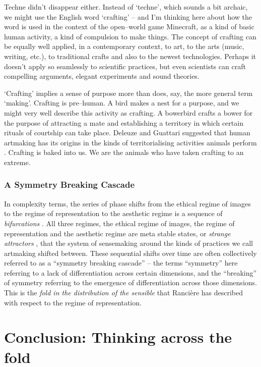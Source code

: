\documentclass[letterpaper]{article}
\begin{document}
    Techne didn't disappear either. Instead of ‘techne’, which sounds a bit archaic, we might use the English word ‘crafting’ – and I'm thinking here about how the word is used in the context of the open–world game Minecraft, as a kind of basic human activity, a kind of compulsion to make things. The concept of crafting can be equally well applied, in a contemporary context, to art, to the arts (music, writing, etc.), to traditional crafts and also to the newest technologies. Perhaps it doesn't apply so seamlessly to scientific practices, but even scientists can craft compelling arguments, elegant experiments and sound theories.

    ‘Crafting’ implies a sense of purpose more than does, say, the more general term ‘making’. Crafting is pre–human. A bird makes a nest for a purpose, and we might very well describe this activity as crafting. A bowerbird crafts a bower for the purpose of attracting a mate and establishing a territory in which certain rituals of courtship can take place. Deleuze and Guattari suggested that human artmaking has its origins in the kinds of territorialising activities animals perform \citep[p.15]{GuattariChsmss1995}. Crafting is baked into us. We are the animals who have taken crafting to an extreme.
    
    \subsubsection{A Symmetry Breaking Cascade}

    In complexity terms, the series of phase shifts from the ethical regime of images to the regime of representation to the aesthetic regime is a sequence of \emph{bifurcations} \citep{LandauThryOfPhstrnstns1936}. All three regimes, the ethical regime of images, the regime of representation and the aesthetic regime are meta stable states, or \emph{strange attractors} \citep{RuelleTakensOnThNtrOfTrblnc1971}, that the system of sensemaking around the kinds of practices we call artmaking shifted between. These sequential shifts over time are often collectively referred to as a “symmetry breaking cascade” – the terms “symmetry” here referring to a lack of differentiation across certain dimensions, and the “breaking” of symmetry referring to the emergence of differentiation across those dimensions. This is the \emph{fold in the distribution of the sensible} that Rancière has described with respect to the regime of representation.

\section{Conclusion: Thinking across the fold}
\end{document}
